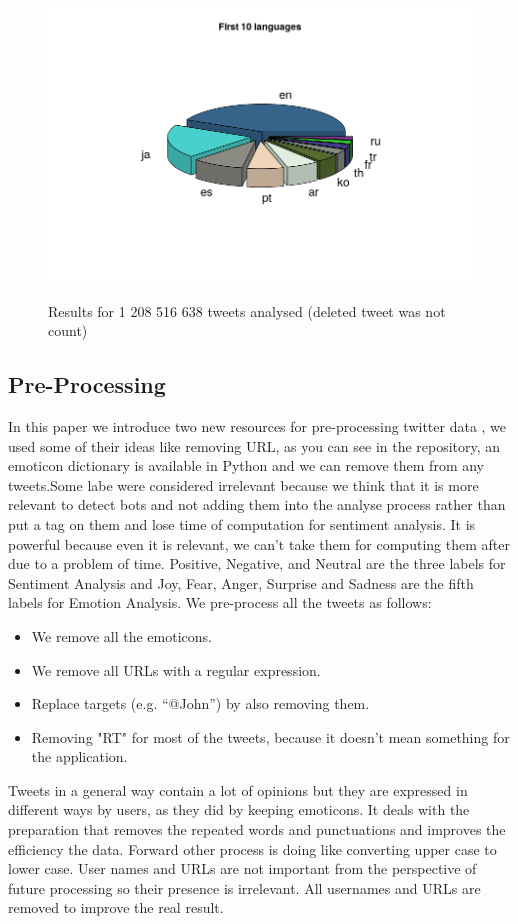 \documentclass{acmtog} %
\begin{document}
\begin{figure}[H]
{\includegraphics[width=\linewidth]{first_ten_languages.png}}
\caption{Results for 1 208 516 638 tweets analysed (deleted tweet was not count)}
  \label{fig:trump_results}
\end{figure}


\subsection{Pre-Processing}
\label{subsub:preprocessing}

In this paper we introduce two new resources for pre-processing twitter data \cite{Jianqiang17}, we used some of their ideas like removing URL, as you can see in the repository, an emoticon dictionary is available in Python and we can remove them from any tweets.Some labe were considered irrelevant \cite{Poddar16} because we think that it is more relevant to detect bots and not adding them into the analyse process rather than put a tag on them and lose time of computation for sentiment analysis. It is powerful because even it is relevant, we can’t take them for computing them after due to a problem of time. Positive, Negative, and Neutral are the three labels for Sentiment Analysis and Joy, Fear, Anger, Surprise and Sadness are the fifth labels for Emotion Analysis. We pre-process all the tweets as follows:
\begin{itemize}
\item  We remove all the emoticons.
\item  We remove all URLs with a regular expression. 
\item  Replace targets (e.g. “@John”) by also removing them.
\item  Removing "RT" for most of the tweets, because it doesn't mean something for the application. 
\end{itemize}
Tweets in a general way contain a lot of opinions but they are expressed in different ways by users, as they did \cite{Rebecca11} by keeping emoticons. It deals with the preparation that removes the repeated words and punctuations and improves the efficiency the data. Forward other process is doing like converting upper case to lower case. User names and URLs are not important from the perspective of future processing so their presence is irrelevant. All usernames and URLs are removed to improve the real result. 
\end{document}
